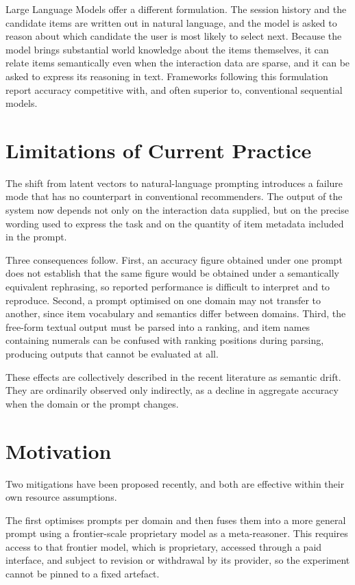 \documentclass[12pt,a4paper,oneside]{report}
\begin{document}
Large Language Models offer a different formulation. The session history and the
candidate items are written out in natural language, and the model is asked to
reason about which candidate the user is most likely to select next. Because the
model brings substantial world knowledge about the items themselves, it can
relate items semantically even when the interaction data are sparse, and it can
be asked to express its reasoning in text. Frameworks following this formulation
report accuracy competitive with, and often superior to, conventional
sequential models.

\section{Limitations of Current Practice}

The shift from latent vectors to natural-language prompting introduces a failure
mode that has no counterpart in conventional recommenders. The output of the
system now depends not only on the interaction data supplied, but on the precise
wording used to express the task and on the quantity of item metadata included
in the prompt.

Three consequences follow. First, an accuracy figure obtained under one prompt
does not establish that the same figure would be obtained under a
semantically equivalent rephrasing, so reported performance is difficult to
interpret and to reproduce. Second, a prompt optimised on one domain may not
transfer to another, since item vocabulary and semantics differ between domains.
Third, the free-form textual output must be parsed into a ranking, and item
names containing numerals can be confused with ranking positions during parsing,
producing outputs that cannot be evaluated at all.

These effects are collectively described in the recent literature as semantic
drift. They are ordinarily observed only indirectly, as a decline in aggregate
accuracy when the domain or the prompt changes.

\section{Motivation}

Two mitigations have been proposed recently, and both are effective within their
own resource assumptions.

The first optimises prompts per domain and then fuses them into a more general
prompt using a frontier-scale proprietary model as a meta-reasoner. This
requires access to that frontier model, which is proprietary, accessed through a
paid interface, and subject to revision or withdrawal by its provider, so the
experiment cannot be pinned to a fixed artefact.
\end{document}

